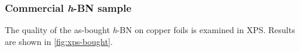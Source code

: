 \subsubsection{Commercial \textit{h}-BN sample}
The quality of the as-bought \textit{h}-BN on copper foils\cite{_graphene_2014} is examined in XPS. Results are shown in \autoref{fig:xps-bought}.
\begin{figure}[ht]
	\centering
\end{figure}
